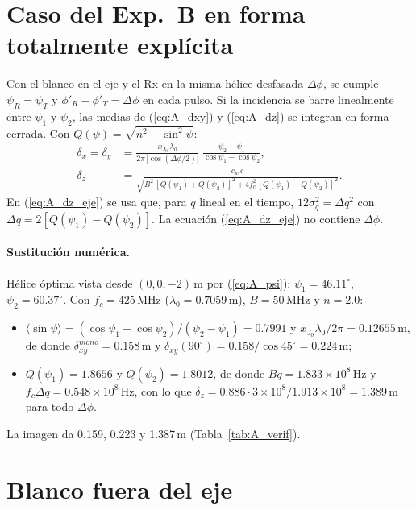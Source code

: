 \section{Caso del Exp.~B en forma totalmente explícita}

Con el blanco en el eje y el Rx en la misma hélice desfasada $\Delta\phi$, se cumple
$\psi_R=\psi_T$ y $\phi'_R-\phi'_T=\Delta\phi$ en cada pulso. Si la incidencia se barre
linealmente entre $\psi_1$ y $\psi_2$, las medias de (\ref{eq:A_dxy}) y (\ref{eq:A_dz})
se integran en forma cerrada. Con $Q(\psi)=\sqrt{n^2-\sin^2\psi}$:
\begin{align}
  \delta_x=\delta_y&=\frac{x_{J_0}\,\lambda_0}{2\pi\,|\cos(\Delta\phi/2)|}\;
  \frac{\psi_2-\psi_1}{\cos\psi_1-\cos\psi_2},\label{eq:A_dxy_eje}\\
  \delta_z&=\frac{c_w\,c}{\sqrt{B^2\,[Q(\psi_1)+Q(\psi_2)]^2+4f_c^2\,[Q(\psi_1)-Q(\psi_2)]^2}} .
  \label{eq:A_dz_eje}
\end{align}
En (\ref{eq:A_dz_eje}) se usa que, para $q$ lineal en el tiempo, $12\sigma_q^2=\Delta q^2$ con
$\Delta q=2[Q(\psi_1)-Q(\psi_2)]$. La ecuación (\ref{eq:A_dz_eje}) no contiene $\Delta\phi$.

\paragraph{Sustitución numérica.} Hélice óptima vista desde $(0,0,-2)$\,m por
(\ref{eq:A_psi}): $\psi_1=46.11^{\circ}$, $\psi_2=60.37^{\circ}$. Con $f_c=425$\,MHz
($\lambda_0=0.7059$\,m), $B=50$\,MHz y $n=2.0$:
\begin{itemize}[itemsep=1pt]
  \item $\langle\sin\psi\rangle=(\cos\psi_1-\cos\psi_2)/(\psi_2-\psi_1)=0.7991$ y
  $x_{J_0}\lambda_0/2\pi=0.12655$\,m, de donde
  $\delta_{xy}^{mono}=0.158$\,m y $\delta_{xy}(90^{\circ})=0.158/\cos45^{\circ}=0.224$\,m;
  \item $Q(\psi_1)=1.8656$ y $Q(\psi_2)=1.8012$, de donde $B\bar q=1.833\times10^{8}$\,Hz y
  $f_c\Delta q=0.548\times10^{8}$\,Hz, con lo que
  $\delta_z=0.886\cdot3\times10^{8}/1.913\times10^{8}=1.389$\,m para todo $\Delta\phi$.
\end{itemize}
La imagen da 0.159, 0.223 y 1.387\,m (Tabla~\ref{tab:A_verif}).

\section{Blanco fuera del eje}

